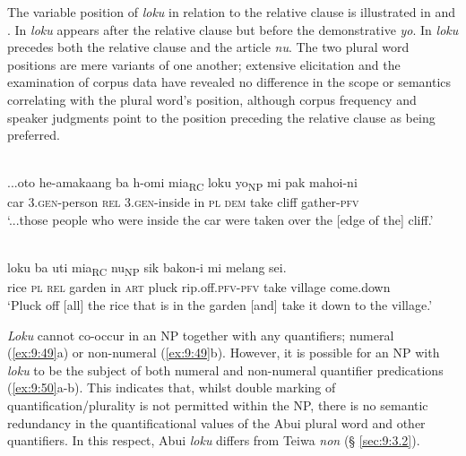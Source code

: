 The variable position of \textit{loku} in relation to the relative clause is illustrated in  and . In  \textit{loku} appears after the relative clause but before the demonstrative \textit{yo}. In  \textit{loku} precedes both the relative clause and the article \textit{nu}. The two plural word positions are mere variants of one another; extensive elicitation and the examination of corpus data have revealed no difference in the scope or semantics correlating with the plural word's position, although corpus frequency and speaker judgments point to the position preceding the relative clause as being preferred.


\ea%
\label{ex:9:47}
 \\
\gll  {\ob}...oto he-amakaang {\ob}{ba} h-omi {mia}{\cb}\textsubscript{\upshape RC} loku yo{\cb}\textsubscript{\upshape NP}  mi pak mahoi-ni \\
  car \textsc{3.gen}-person \textsc{rel} \textsc{3.gen}-inside in \textsc{pl} \textsc{dem}   take cliff gather-\textsc{pfv}  \\
\glt `...those people who were inside the car were taken over the [edge of the] cliff.'
\z
 

\ea%
\label{ex:9:48}
 \\
 loku {\ob}{ba} uti {mia}{\cb}\textsubscript{\upshape RC} {nu}{\cb}\textsubscript{\upshape NP} sik bakon-i   mi melang sei. \\
   rice \textsc{pl} \textsc{rel} garden in \textsc{art} pluck rip.off.\textsc{pfv-pfv}   take village come.down \\
\glt `Pluck off [all] the rice that is in the garden [and] take it down to the village.'
\z

 




\textit{Loku} cannot co-occur in an NP together with any quantifiers; numeral (\ref{ex:9:49}a) or non-numeral (\ref{ex:9:49}b). However, it is possible for an NP with \textit{loku} to be the subject of both numeral and non-numeral quantifier predications (\ref{ex:9:50}a-b). This indicates that, whilst double marking of quantification/plurality is not permitted within the NP, there is no semantic redundancy in the quantificational values of the Abui plural word and other quantifiers. In this respect, Abui \textit{loku} differs from Teiwa \textit{non} ({\S} \ref{sec:9:3.2}).


